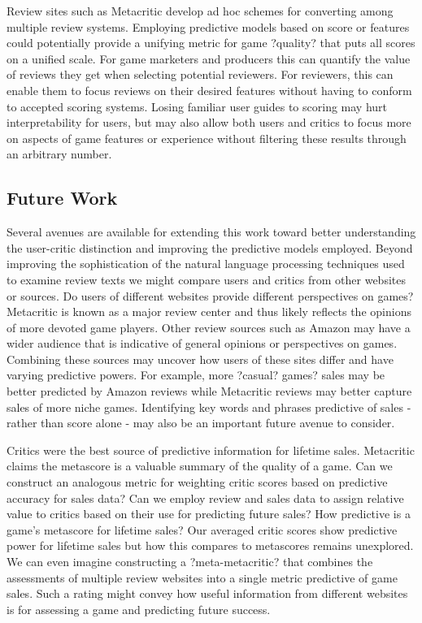 \documentclass[letterpaper]{article}
\begin{document}
Review sites such as Metacritic develop ad hoc schemes for converting among multiple review systems. Employing predictive models based on score or features could potentially provide a unifying metric for game ?quality? that puts all scores on a unified scale. For game marketers and producers this can quantify the value of reviews they get when selecting potential reviewers. For reviewers, this can enable them to focus reviews on their desired features without having to conform to accepted scoring systems. Losing familiar user guides to scoring may hurt interpretability for users, but may also allow both users and critics to focus more on aspects of game features or experience without filtering these results through an arbitrary number.

\subsection{Future Work}
Several avenues are available for extending this work toward better understanding the user-critic distinction and improving the predictive models employed. Beyond improving the sophistication of the natural language processing techniques used to examine review texts we might compare users and critics from other websites or sources. Do users of different websites provide different perspectives on games? Metacritic is known as a major review center and thus likely reflects the opinions of more devoted game players. Other review sources such as Amazon may have a wider audience that is indicative of general opinions or perspectives on games. Combining these sources may uncover how users of these sites differ and have varying predictive powers. For example, more ?casual? games? sales may be better predicted by Amazon reviews while Metacritic reviews may better capture sales of more niche games. Identifying key words and phrases predictive of sales - rather than score alone - may also be an important future avenue to consider.

Critics were the best source of predictive information for lifetime sales. Metacritic claims the metascore is a valuable summary of the quality of a game. Can we construct an analogous metric for weighting critic scores based on predictive accuracy for sales data? Can we employ review and sales data to assign relative value to critics based on their use for predicting future sales? How predictive is a game's metascore for lifetime sales? Our averaged critic scores show predictive power for lifetime sales but how this compares to metascores remains unexplored. We can even imagine constructing a ?meta-metacritic? that combines the assessments of multiple review websites into a single metric predictive of game sales. Such a rating might convey how useful information from different websites is for assessing a game and predicting future success.
\end{document}
